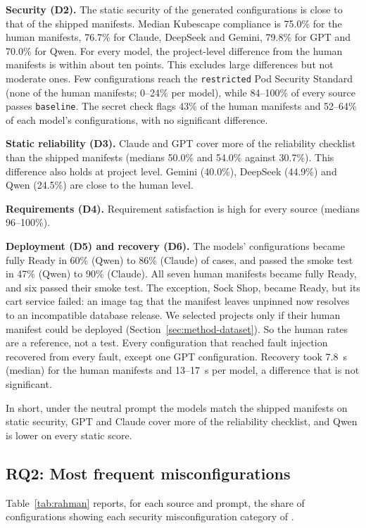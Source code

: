 \textbf{Security (D2).} The static security of the generated configurations is close to that of the shipped manifests. Median Kubescape compliance is 75.0\% for the human manifests, 76.7\% for Claude, DeepSeek and Gemini, 79.8\% for GPT and 70.0\% for Qwen. For every model, the project-level difference from the human manifests is within about ten points. This excludes large differences but not moderate ones. Few configurations reach the \texttt{restricted} Pod Security Standard (none of the human manifests; 0--24\% per model), while 84--100\% of every source passes \texttt{baseline}. The secret check flags 43\% of the human manifests and 52--64\% of each model's configurations, with no significant difference.

\textbf{Static reliability (D3).} Claude and GPT cover more of the reliability checklist than the shipped manifests (medians 50.0\% and 54.0\% against 30.7\%). This difference also holds at project level. Gemini (40.0\%), DeepSeek (44.9\%) and Qwen (24.5\%) are close to the human level.

\textbf{Requirements (D4).} Requirement satisfaction is high for every source (medians 96--100\%).

\textbf{Deployment (D5) and recovery (D6).} The models' configurations became fully Ready in 60\% (Qwen) to 86\% (Claude) of cases, and passed the smoke test in 47\% (Qwen) to 90\% (Claude). All seven human manifests became fully Ready, and six passed their smoke test. The exception, Sock Shop, became Ready, but its cart service failed: an image tag that the manifest leaves unpinned now resolves to an incompatible database release. We selected projects only if their human manifest could be deployed (Section~\ref{sec:method-dataset}). So the human rates are a reference, not a test. Every configuration that reached fault injection recovered from every fault, except one GPT configuration. Recovery took 7.8~s (median) for the human manifests and 13--17~s per model, a difference that is not significant.

In short, under the neutral prompt the models match the shipped manifests on static security, GPT and Claude cover more of the reliability checklist, and Qwen is lower on every static score.

\subsection{RQ2: Most frequent misconfigurations}\label{sec:res-rq2}

Table~\ref{tab:rahman} reports, for each source and prompt, the share of configurations showing each security misconfiguration category of \citet{rahman2023k8smisconfig}.

